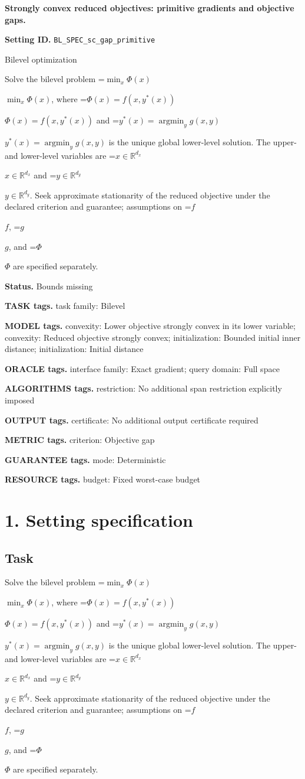 \documentclass[10pt,a4paper]{article}
\newcommand{\AtlasMath}[1]{\par\begingroup\centering\setbox0=\hbox{$\displaystyle #1$}\ifdim\wd0>1.4\linewidth\typeout{ATLAS WIDE FORMULA: \the\wd0}\fi\ifdim\wd0>\linewidth\resizebox{\linewidth}{!}{\box0}\else\box0\fi\par\endgroup}
\newcommand{\AtlasInlineMath}[1]{\begingroup\setbox0=\hbox{$#1$}\ifdim\wd0>.4\linewidth\endgroup\AtlasMath{#1}\else\endgroup$#1$\fi}
\begin{document}
\raggedright

{\LARGE\bfseries\sffamily\color{AtlasNavy} Strongly convex reduced objectives: primitive gradients and objective gaps.\par}\vspace{5pt}
\textbf{Setting ID.} \texttt{BL\_\allowbreak{}SPEC\_\allowbreak{}sc\_\allowbreak{}gap\_\allowbreak{}primitive}

Bilevel optimization

Solve the bilevel problem \AtlasInlineMath{\min_x\Phi(x)}, where \AtlasInlineMath{\Phi(x)=f(x,y^*(x))} and \AtlasInlineMath{y^*(x)=\operatorname*{argmin}_y g(x,y)} is the unique global lower-level solution. The upper- and lower-level variables are \AtlasInlineMath{x\in\mathbb{R}^{d_x}} and \AtlasInlineMath{y\in\mathbb{R}^{d_y}}. Seek approximate stationarity of the reduced objective under the declared criterion and guarantee; assumptions on \AtlasInlineMath{f}, \AtlasInlineMath{g}, and \AtlasInlineMath{\Phi} are specified separately.

\textbf{Status.} Bounds missing

\textbf{TASK tags.} task family: Bilevel

\textbf{MODEL tags.} convexity: Lower objective strongly convex in its lower variable; convexity: Reduced objective strongly convex; initialization: Bounded initial inner distance; initialization: Initial distance

\textbf{ORACLE tags.} interface family: Exact gradient; query domain: Full space

\textbf{ALGORITHMS tags.} restriction: No additional span restriction explicitly imposed

\textbf{OUTPUT tags.} certificate: No additional output certificate required

\textbf{METRIC tags.} criterion: Objective gap

\textbf{GUARANTEE tags.} mode: Deterministic

\textbf{RESOURCE tags.} budget: Fixed worst-case budget

\section{1. Setting specification}
\subsection{Task}
Solve the bilevel problem \AtlasInlineMath{\min_x\Phi(x)}, where \AtlasInlineMath{\Phi(x)=f(x,y^*(x))} and \AtlasInlineMath{y^*(x)=\operatorname*{argmin}_y g(x,y)} is the unique global lower-level solution. The upper- and lower-level variables are \AtlasInlineMath{x\in\mathbb{R}^{d_x}} and \AtlasInlineMath{y\in\mathbb{R}^{d_y}}. Seek approximate stationarity of the reduced objective under the declared criterion and guarantee; assumptions on \AtlasInlineMath{f}, \AtlasInlineMath{g}, and \AtlasInlineMath{\Phi} are specified separately.
\end{document}
